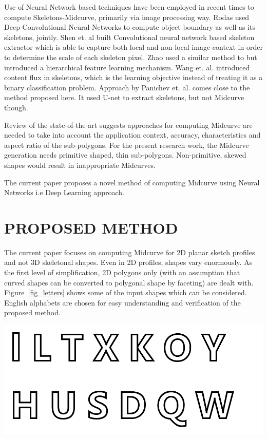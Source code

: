 \documentclass[9pt,academicons]{article}
\begin{document}
Use of Neural Network based techniques have been employed in recent times to compute Skeletons-Midcurve, primarily via image processing way. Rodas \cite{Rodas2019JointOB} used Deep Convolutional Neural Networks to compute object boundary as well as its skeletons, jointly. Shen et. al \cite{shen2016object,Shen_2017} built Convolutional neural network based skeleton extractor which is able to capture both local and non-local image context in order to determine the scale of each skeleton pixel. Zhao \cite{zhao2018hifi} used a similar method to \cite{shen2016object,Shen_2017} but introduced a hierarchical feature learning mechanism. Wang et. al.\cite{wang2018deepflux} introduced content flux in skeletons, which is
the learning objective instead of treating it as a binary classification problem. Approach by Panichev et. al. \cite{Panichev_2019_CVPR_Workshops} comes close to the method proposed here. It used U-net to extract skeletons, but not Midcurve though.
	
Review of the state-of-the-art suggests approaches for computing Midcurve are needed to take into account the application context, accuracy, characteristics  and aspect ratio of the sub-polygons. For the present research work, the Midcurve generation needs primitive shaped, thin sub-polygons. Non-primitive, skewed shapes would result in inappropriate Midcurves.

The current paper proposes a novel method of computing Midcurve using Neural Networks i.e Deep Learning approach.
 
 
\section{PROPOSED METHOD}
\label{sec:proposedmethod}

The current paper focuses on computing Midcurve for 2D planar sketch profiles and not 3D skeletonal shapes.  Even in 2D profiles, shapes vary enormously. As the first level of simplification, 2D polygons only (with an assumption that curved shapes can be converted to polygonal shape by faceting) are dealt with. Figure~\ref{fig_letters} shows some of the input shapes which can be considered. English alphabets are chosen for easy understanding and verification of the proposed method.

     \begin{center}
	\includegraphics[width=0.9\linewidth]{images/Letters}
	\label{fig_letters}
    \end{center}
		
\end{document}

